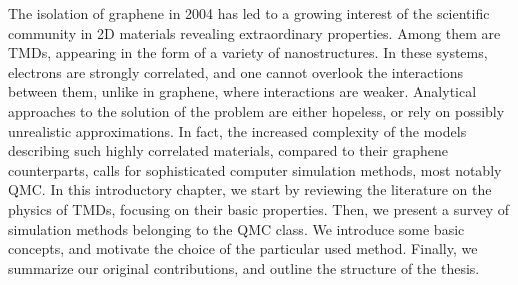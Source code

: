 
\label{cap:int}

\slshape

The isolation of graphene in 2004 has led to a growing interest of the scientific community in \ac{2D} materials revealing extraordinary properties.
Among them are \acp{TMD}, appearing in the form of a variety of nanostructures.
In these systems, electrons are strongly correlated, and one cannot overlook the interactions between them, unlike in graphene, where interactions are weaker.
Analytical approaches to the solution of the problem are either hopeless, or rely on possibly unrealistic approximations.
In fact, the increased complexity of the models describing such highly correlated  materials, compared to their graphene counterparts, calls for sophisticated computer simulation methods, most notably \ac{QMC}.
In this introductory chapter, we start by  reviewing the literature on the physics of \acp{TMD}, focusing on their basic properties.
Then, we present a survey of simulation methods belonging to the \acl{QMC} class.
We introduce some basic concepts, and motivate the choice of the particular used  method.
Finally, we summarize our original contributions, and outline the structure of the thesis.

\normalfont








\cleardoublepage